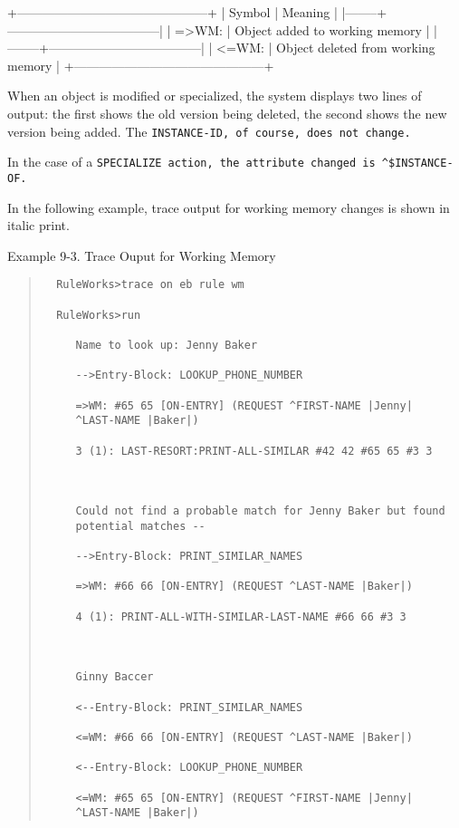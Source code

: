\begin{note}
+---------------------------------------------+
| Symbol | Meaning                            |
|--------+------------------------------------|
| =>WM:  | Object added to working memory     |
|--------+------------------------------------|
| <=WM:  | Object deleted from working memory |
+---------------------------------------------+

When an object is modified or specialized, the system displays two
lines of output: the first shows the old version being deleted, the
second shows the new version being added. The \tt{INSTANCE-ID}, of
course, does not change.

In the case of a \tt{SPECIALIZE} action, the attribute changed is
\verb|^$INSTANCE-OF|.

In the following example, trace output for working memory
changes is shown in italic print.

Example 9-3. Trace Ouput for Working Memory
\begin{quote}
\begin{verbatim}
  RuleWorks>trace on eb rule wm

  RuleWorks>run

     Name to look up: Jenny Baker

     -->Entry-Block: LOOKUP_PHONE_NUMBER

     =>WM: #65 65 [ON-ENTRY] (REQUEST ^FIRST-NAME |Jenny|
     ^LAST-NAME |Baker|)

     3 (1): LAST-RESORT:PRINT-ALL-SIMILAR #42 42 #65 65 #3 3

      

     Could not find a probable match for Jenny Baker but found
     potential matches --

     -->Entry-Block: PRINT_SIMILAR_NAMES

     =>WM: #66 66 [ON-ENTRY] (REQUEST ^LAST-NAME |Baker|)

     4 (1): PRINT-ALL-WITH-SIMILAR-LAST-NAME #66 66 #3 3

      

     Ginny Baccer

     <--Entry-Block: PRINT_SIMILAR_NAMES

     <=WM: #66 66 [ON-ENTRY] (REQUEST ^LAST-NAME |Baker|)

     <--Entry-Block: LOOKUP_PHONE_NUMBER

     <=WM: #65 65 [ON-ENTRY] (REQUEST ^FIRST-NAME |Jenny|
     ^LAST-NAME |Baker|)
\end{verbatim}
\end{quote}  


\end{note}
